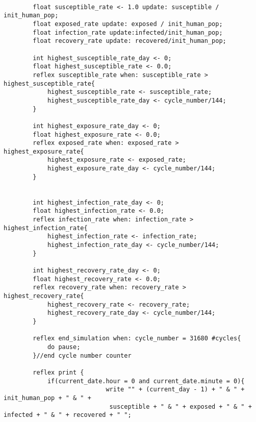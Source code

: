 \begin{lstlisting}
        
        float susceptible_rate <- 1.0 update: susceptible / init_human_pop;
        float exposed_rate update: exposed / init_human_pop;
        float infection_rate update:infected/init_human_pop;
        float recovery_rate update: recovered/init_human_pop;
        
        int highest_susceptible_rate_day <- 0;
        float highest_susceptible_rate <- 0.0;
        reflex susceptible_rate when: susceptible_rate > highest_susceptible_rate{
            highest_susceptible_rate <- susceptible_rate;
            highest_susceptible_rate_day <- cycle_number/144;
        }	
        
        int highest_exposure_rate_day <- 0;
        float highest_exposure_rate <- 0.0;
        reflex exposed_rate when: exposed_rate > highest_exposure_rate{
            highest_exposure_rate <- exposed_rate;
            highest_exposure_rate_day <- cycle_number/144;
        }	
        
        
        int highest_infection_rate_day <- 0;
        float highest_infection_rate <- 0.0;
        reflex infection_rate when: infection_rate > highest_infection_rate{
            highest_infection_rate <- infection_rate;
            highest_infection_rate_day <- cycle_number/144;
        }
        
        int highest_recovery_rate_day <- 0;
        float highest_recovery_rate <- 0.0;
        reflex recovery_rate when: recovery_rate > highest_recovery_rate{
            highest_recovery_rate <- recovery_rate;
            highest_recovery_rate_day <- cycle_number/144;
        }
        
        reflex end_simulation when: cycle_number = 31680 #cycles{
            do pause;
        }//end cycle number counter
        
        reflex print {
            if(current_date.hour = 0 and current_date.minute = 0){
                            write "" + (current_day - 1) + " & " + init_human_pop + " & " +
                             susceptible + " & " + exposed + " & " + infected + " & " + recovered + " ";
                

\end{lstlisting}
